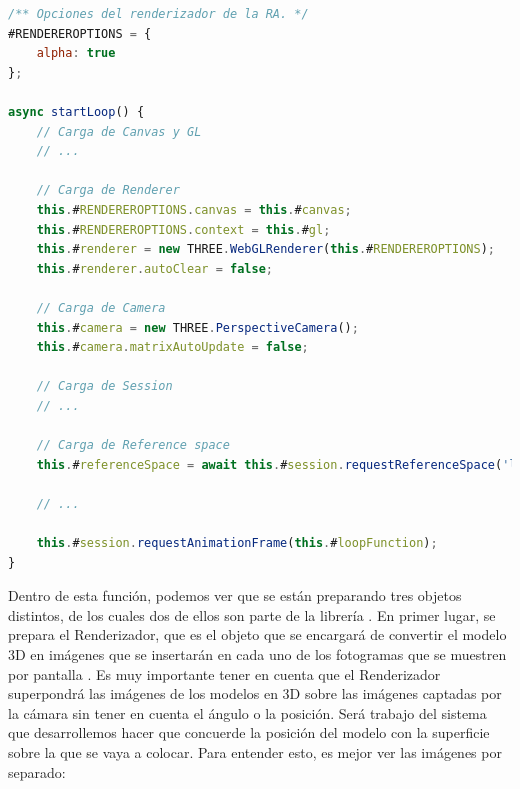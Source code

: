 \documentclass{subfiles}
\begin{document}
\begin{lstlisting}[language=JavaScript, caption={Carga de elementos de Three.js antes de lanzar el bucle.}, label={lst:3.2}]
/** Opciones del renderizador de la RA. */
#RENDEREROPTIONS = {
    alpha: true
};

async startLoop() {
    // Carga de Canvas y GL
    // ...

    // Carga de Renderer
    this.#RENDEREROPTIONS.canvas = this.#canvas;
    this.#RENDEREROPTIONS.context = this.#gl;
    this.#renderer = new THREE.WebGLRenderer(this.#RENDEREROPTIONS);
    this.#renderer.autoClear = false;

    // Carga de Camera
    this.#camera = new THREE.PerspectiveCamera();
    this.#camera.matrixAutoUpdate = false;

    // Carga de Session
    // ...

    // Carga de Reference space
    this.#referenceSpace = await this.#session.requestReferenceSpace('local');

    // ...

    this.#session.requestAnimationFrame(this.#loopFunction);
}
\end{lstlisting}

        Dentro de esta función, podemos ver que se están preparando tres objetos distintos, de los cuales dos de ellos son parte de la librería \threejs. En primer lugar, se prepara el Renderizador, que es el objeto que se encargará de convertir el modelo 3D en imágenes que se insertarán en cada uno de los fotogramas que se muestren por pantalla \cite{web:threejs_webglrenderer}. Es muy importante tener en cuenta que el Renderizador superpondrá las imágenes de los modelos en 3D sobre las imágenes captadas por la cámara sin tener en cuenta el ángulo o la posición. Será trabajo del sistema que desarrollemos hacer que concuerde la posición del modelo con la superficie sobre la que se vaya a colocar. Para entender esto, es mejor ver las imágenes por separado:
\end{document}

